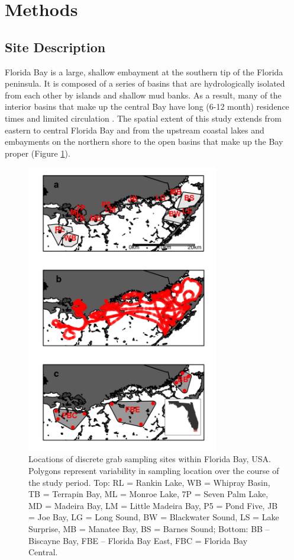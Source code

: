 \section{Methods}
\label{methods}
\subsection{Site Description}
\label{sitedescription}
Florida Bay is a large, shallow embayment at the southern tip of the Florida peninsula. It is composed of a series of basins that are hydrologically isolated from each other by islands and shallow mud banks. As a result, many of the interior basins that make up the central Bay have long (6-12 month) residence times and limited circulation \citep{lee2016circulation}. The spatial extent of this study extends from eastern to central Florida Bay and from the upstream coastal lakes and embayments on the northern shore to the open basins that make up the Bay proper (Figure \ref{fig:1}). 

\begin{figure}
  \centering
  \includegraphics[width=0.75\textwidth]{../../figures/fbmap.png}
  \caption{Locations of discrete grab sampling sites within Florida Bay, USA. Polygons represent variability in sampling location over the course of the study period. Top: RL = Rankin Lake, WB = Whipray Basin, TB = Terrapin Bay, ML = Monroe Lake, 7P = Seven Palm Lake, MD = Madeira Bay, LM = Little Madeira Bay, P5 = Pond Five, JB = Joe Bay, LG = Long Sound, BW = Blackwater Sound, LS = Lake Surprise, MB = Manatee Bay, BS = Barnes Sound; Bottom: BB – Biscayne Bay, FBE – Florida Bay East, FBC = Florida Bay Central.}
  \label{fig:1}
\end{figure}

